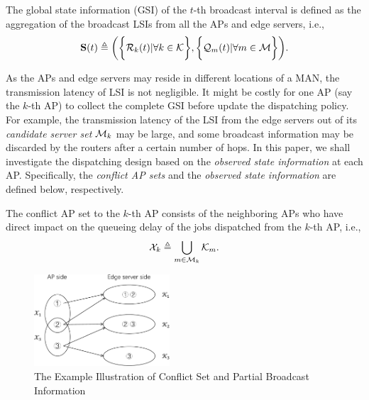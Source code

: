 \begin{definition}
    The global state information (GSI) of the $t$-th broadcast interval is defined as the aggregation of the broadcast LSIs from all the APs and edge servers, i.e.,
    \begin{align}
        \mathbf{S}(t) \triangleq
            \bigg(
                \bigg\{\mathcal{R}_{k}(t)|\forall k\in\mathcal{K}\bigg\},
                \bigg\{\mathcal{Q}_{m}(t)|\forall m\in\mathcal{M}\bigg\}
            \bigg).
    \end{align}
\end{definition}

As the APs and edge servers may reside in different locations of a MAN, the transmission latency of LSI is not negligible.
It might be costly for one AP (say the $k$-th AP) to collect the complete GSI before update the dispatching policy.
For example, the transmission latency of the LSI from the edge servers out of its \emph{candidate server set} $\mathcal{M}_{k}$ may be large, and some broadcast information may be discarded by the routers after a certain number of hops.
In this paper, we shall investigate the dispatching design based on the \emph{observed state information} at each AP.
Specifically, the \emph{conflict AP sets} and the \emph{observed state information} are defined below, respectively.
\begin{definition}
    The conflict AP set to the $k$-th AP consists of the neighboring APs who have direct impact on the queueing delay of the jobs dispatched from the $k$-th AP, i.e.,
    \begin{align}
        \mathcal{X}_{k} \triangleq \bigcup_{m\in\mathcal{M}_{k}} \mathcal{K}_{m}.
    \end{align}
\end{definition}

\begin{figure}[tp]
    \centering
    \includegraphics[width=0.45\textwidth]{images/conflict.pdf}
    \caption{The Example Illustration of Conflict Set and Partial Broadcast Information}
    \label{fig:conflict}
\end{figure}

